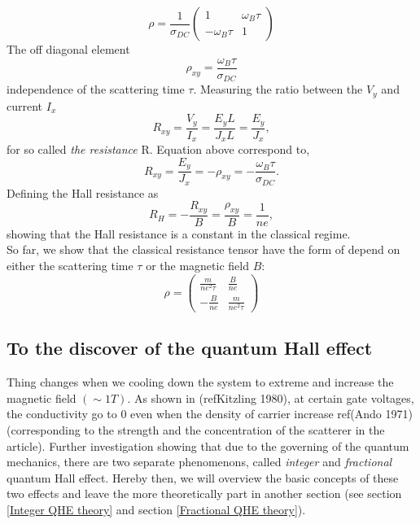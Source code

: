 \documentclass[unnumsec,webpdf,modern,large]{mam-authoring-template}%
\theoremstyle{thmstyleone}%
\theoremstyle{thmstyletwo}%
\theoremstyle{thmstylethree}%
\begin{document}
\begin{equation}
	\rho
	=\frac{1}{\sigma_{DC}} \begin{pmatrix}
		1 & \omega_B \tau\\
		-\omega_B \tau & 1
	\end{pmatrix}
\end{equation}
The off diagonal element
$$\rho_{xy} = \frac{\omega_B \tau}{\sigma_{DC}}$$
independence of the scattering time \(\tau\). Measuring the ratio between the \(V_y\) and current \(I_x\)
\begin{equation}
	R_{xy} = \frac{V_y}{I_x} = \frac{E_y L}{J_x L} = \frac{E_y}{J_x},
\end{equation}
for so called \textit{the resistance} R. Equation above correspond to,
\begin{equation}
	R_{xy} =  \frac{E_y}{J_x} = -\rho_{xy} = - \frac{\omega_B \tau}{\sigma_{DC}}.
\end{equation}
\quad Defining the Hall resistance as
\begin{equation}\label{Hall def.}
	R_H = -\frac{R_{xy}}{B} = \frac{\rho_{xy}}{B} = \frac{1}{n e},
\end{equation}
\quad showing that the Hall resistance is a constant in the classical regime.\\
So far, we show that the classical resistance tensor have the form of depend on either the scattering time \(\tau\) or the magnetic field \(B\):
\begin{equation}
	\rho = \begin{pmatrix}
		\frac{m}{ne^2\tau} & \frac{B}{ne}\\
	- \frac{B}{ne} & \frac{m}{ne^2\tau}
	\end{pmatrix}
\end{equation}
\subsection{To the discover of the quantum Hall effect}\label{Introsub2}
\quad Thing changes when we cooling down the system to extreme and increase the magnetic field \((\sim 1 T)\). As shown in (ref{Kitzling 1980}), at certain gate voltages, the conductivity go to 0 even when the density of carrier increase ref(Ando 1971) (corresponding to the strength and the concentration of the scatterer in the article). Further investigation showing that due to the governing of the quantum mechanics, there are two separate phenomenons, called \textit{integer} and \textit{fractional} quantum Hall effect. Hereby then, we will overview the basic concepts of these two effects and leave the more theoretically part in another section (see section \ref{Integer QHE theory} and section \ref{Fractional QHE theory}).
\end{document}
